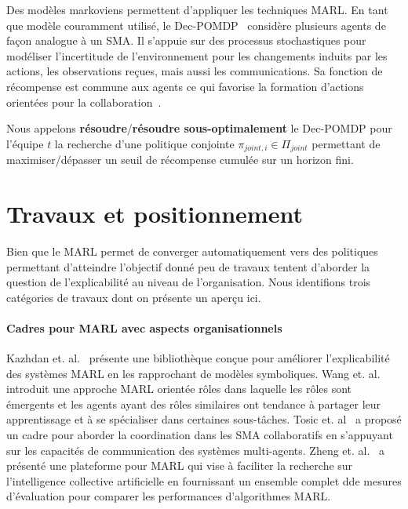 \documentclass[demonstration]{jfsma}
\newcommand{\probP}{\text{I\kern-0.15em P}}
\begin{document}
Des modèles markoviens permettent d'appliquer les techniques MARL. En tant que modèle couramment utilisé, le Dec-POMDP~\cite{Oliehoek2016} considère plusieurs agents de façon analogue à un SMA. Il s'appuie sur des processus stochastiques pour modéliser l'incertitude de l'environnement pour les changements induits par les actions, les observations reçues, mais aussi les communications. Sa fonction de récompense est commune aux agents ce qui favorise la formation d'actions orientées pour la collaboration~\cite{Beynier2013}.

Nous appelons \textbf{résoudre}/\textbf{résoudre sous-optimalement} le Dec-POMDP pour l'équipe $t$ la recherche d'une politique conjointe $\pi_{joint,i} \in \Pi_{joint}$ permettant de maximiser/dépasser un seuil de récompense cumulée sur un horizon fini.


\section{Travaux et positionnement}

Bien que le MARL permet de converger automatiquement vers des politiques permettant d'atteindre l'objectif donné peu de travaux tentent d’aborder la question de l'explicabilité au niveau de l'organisation. Nous identifions trois catégories de travaux dont on présente un aperçu ici.

\paragraph{\textbf{Cadres pour MARL avec aspects organisationnels}}
%
Kazhdan et. al.~\cite{Kazhdan2020} présente une bibliothèque conçue pour améliorer l'explicabilité des systèmes MARL en les rapprochant de modèles symboliques.
%
Wang et. al.~\cite{Wang2020} introduit une approche MARL orientée rôles dans laquelle les rôles sont émergents et les agents ayant des rôles similaires ont tendance à partager leur apprentissage et à se spécialiser dans certaines sous-tâches.
%
Tosic et. al~\cite{Tosic2010} a proposé un cadre pour aborder la coordination dans les SMA collaboratifs en s'appuyant sur les capacités de communication des systèmes multi-agents.
%
Zheng et. al.~\cite{Zheng2018} a présenté une plateforme pour MARL qui vise à faciliter la recherche sur l'intelligence collective artificielle en fournissant un ensemble complet dde mesures d'évaluation pour comparer les performances d'algorithmes MARL.
\end{document}
